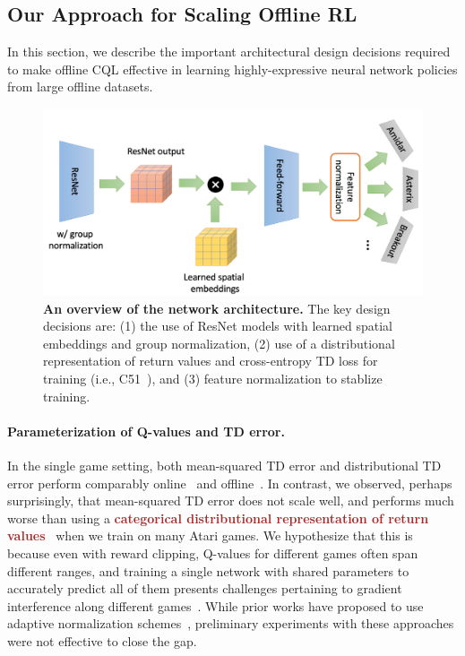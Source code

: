 \vspace{-0.35cm}
\subsection{Our Approach for Scaling Offline RL}
\label{sec:method}
\vspace{-0.3cm}

In this section, we describe the important architectural design decisions required to make offline CQL effective in learning highly-expressive neural network policies from large offline datasets. 

\begin{figure}[t]
    \centering
    \includegraphics[width=0.6\linewidth]{chapters/scaled_ql/figures/network_figure.pdf}
    \vspace{-0.3cm}
    \caption{\footnotesize{\textbf{An overview of the network architecture.} The key design decisions are: (1) the use of ResNet models with learned spatial embeddings and group normalization, (2) use of a distributional representation of return values and cross-entropy TD loss for training (i.e., C51~\citep{bellemare2017distributional}), and (3) feature normalization to stablize training.}}
    \label{fig:architecture}
    \vspace{-0.3cm}
\end{figure}
\paragraph{Parameterization of Q-values and TD error.} In the single game setting, both mean-squared TD error and distributional TD error perform comparably online~\citep{agarwal2021deep} and offline~\citep{kumar2020conservative,kumar2021dr3}. In contrast,  
we observed, perhaps surprisingly, that mean-squared TD error does not scale well, and performs much worse than using a \textcolor{brown}{\textbf{categorical distributional representation of return values}}~\citep{bellemare2017distributional} when we train on many Atari games. We hypothesize that this is because even with reward clipping, Q-values for different games often span different ranges, and training a single network with shared parameters to accurately predict all of them presents challenges pertaining to gradient interference along different games~\citep{hessel2019popart, yu2020gradient}. 
While prior works have proposed to use adaptive normalization schemes~\citep{hessel2019popart,kurin2022defense}, preliminary experiments with these approaches were not effective to close the gap. 



